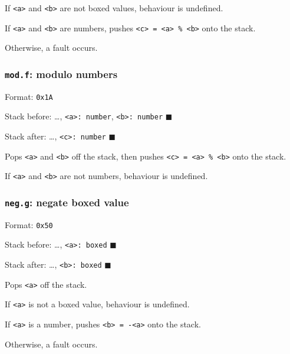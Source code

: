 If \texttt{\textless{}a\textgreater{}} and
\texttt{\textless{}b\textgreater{}} are not boxed values, behaviour is
undefined.

If \texttt{\textless{}a\textgreater{}} and
\texttt{\textless{}b\textgreater{}} are numbers, pushes
\texttt{\textless{}c\textgreater{}\ =\ \textless{}a\textgreater{}\ \%\ \textless{}b\textgreater{}}
onto the stack.

Otherwise, a fault occurs.

\subsubsection{\texorpdfstring{\texttt{mod.f}: modulo
numbers}{mod.f: modulo numbers}}

Format: \texttt{0x1A}

Stack before: \ldots, \texttt{\textless{}a\textgreater{}:\ number},
\texttt{\textless{}b\textgreater{}:\ number} \(\blacksquare\)

Stack after: \ldots, \texttt{\textless{}c\textgreater{}:\ number}
\(\blacksquare\)

Pops \texttt{\textless{}a\textgreater{}} and
\texttt{\textless{}b\textgreater{}} off the stack, then pushes
\texttt{\textless{}c\textgreater{}\ =\ \textless{}a\textgreater{}\ \%\ \textless{}b\textgreater{}}
onto the stack.

If \texttt{\textless{}a\textgreater{}} and
\texttt{\textless{}b\textgreater{}} are not numbers, behaviour is
undefined.

\subsubsection{\texorpdfstring{\texttt{neg.g}: negate boxed
value}{neg.g: negate boxed value}}

Format: \texttt{0x50}

Stack before: \ldots, \texttt{\textless{}a\textgreater{}:\ boxed}
\(\blacksquare\)

Stack after: \ldots, \texttt{\textless{}b\textgreater{}:\ boxed}
\(\blacksquare\)

Pops \texttt{\textless{}a\textgreater{}} off the stack.

If \texttt{\textless{}a\textgreater{}} is not a boxed value, behaviour
is undefined.

If \texttt{\textless{}a\textgreater{}} is a number, pushes
\texttt{\textless{}b\textgreater{}\ =\ -\textless{}a\textgreater{}} onto
the stack.

Otherwise, a fault occurs.

